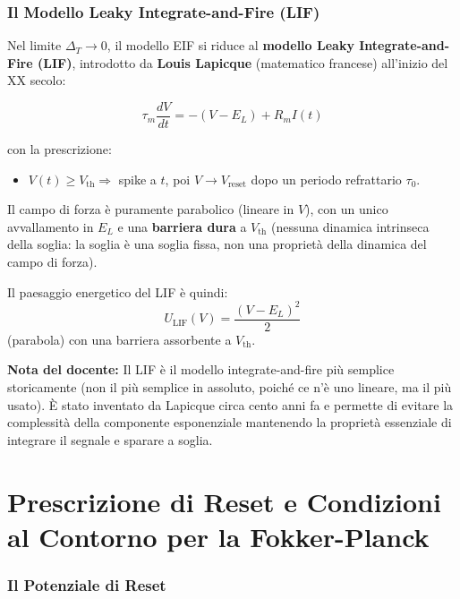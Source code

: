 \subsubsection{Il Modello Leaky Integrate-and-Fire (LIF)}

Nel limite $\Delta_T \to 0$, il modello EIF si riduce al \textbf{modello Leaky Integrate-and-Fire (LIF)}, introdotto da \textbf{Louis Lapicque} (matematico francese) all'inizio del XX secolo:

\begin{equation}
\tau_m \frac{dV}{dt} = -(V - E_L) + R_m I(t)
\end{equation}

con la prescrizione:
\begin{itemize}
    \item $V(t) \geq V_{\text{th}} \Rightarrow$ spike a $t$, poi $V \to V_{\text{reset}}$ dopo un periodo refrattario $\tau_0$.
\end{itemize}

Il campo di forza è puramente parabolico (lineare in $V$), con un unico avvallamento in $E_L$ e una \textbf{barriera dura} a $V_{\text{th}}$ (nessuna dinamica intrinseca della soglia: la soglia è una soglia fissa, non una proprietà della dinamica del campo di forza).

Il paesaggio energetico del LIF è quindi:
\begin{equation}
U_{\text{LIF}}(V) = \frac{(V - E_L)^2}{2}
\end{equation}
(parabola) con una barriera assorbente a $V_{\text{th}}$.

\begin{tcolorbox}[colback=gray!5, colframe=gray!40, arc=2mm, boxrule=0.5pt]
\textbf{Nota del docente:} Il LIF è il modello integrate-and-fire più semplice storicamente (non il più semplice in assoluto, poiché ce n'è uno lineare, ma il più usato). È stato inventato da Lapicque circa cento anni fa e permette di evitare la complessità della componente esponenziale mantenendo la proprietà essenziale di integrare il segnale e sparare a soglia.
\end{tcolorbox}


\section{Prescrizione di Reset e Condizioni al Contorno per la Fokker-Planck}

\subsubsection{Il Potenziale di Reset}

